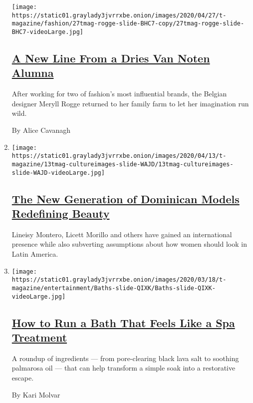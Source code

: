 \begin{enumerate}
  \texttt{[image: https://static01.graylady3jvrrxbe.onion/images/2020/04/27/t-magazine/fashion/27tmag-rogge-slide-BHC7-copy/27tmag-rogge-slide-BHC7-videoLarge.jpg]}

  \hypertarget{a-new-line-from-a-dries-van-noten-alumna}{%
  \subsection{\texorpdfstring{\href{/2020/05/04/t-magazine/meryll-rogge.html}{A
  New Line From a Dries Van Noten
  Alumna}}{A New Line From a Dries Van Noten Alumna}}\label{a-new-line-from-a-dries-van-noten-alumna}}

  After working for two of fashion's most influential brands, the
  Belgian designer Meryll Rogge returned to her family farm to let her
  imagination run wild.

  By Alice Cavanagh
\item
  \texttt{[image: https://static01.graylady3jvrrxbe.onion/images/2020/04/13/t-magazine/13tmag-cultureimages-slide-WAJD/13tmag-cultureimages-slide-WAJD-videoLarge.jpg]}

  \hypertarget{the-new-generation-of-dominican-models-redefining-beauty}{%
  \subsection{\texorpdfstring{\href{/interactive/2020/04/13/t-magazine/dominican-republic-models.html}{The
  New Generation of Dominican Models Redefining
  Beauty}}{The New Generation of Dominican Models Redefining Beauty}}\label{the-new-generation-of-dominican-models-redefining-beauty}}

  Lineisy Montero, Licett Morillo and others have gained an
  international presence while also subverting assumptions about how
  women should look in Latin America.
\item
  \texttt{[image: https://static01.graylady3jvrrxbe.onion/images/2020/03/18/t-magazine/entertainment/Baths-slide-QIXK/Baths-slide-QIXK-videoLarge.jpg]}

  \hypertarget{how-to-run-a-bath-that-feels-like-a-spa-treatment}{%
  \subsection{\texorpdfstring{\href{/2020/03/20/t-magazine/best-bath-products.html}{How
  to Run a Bath That Feels Like a Spa
  Treatment}}{How to Run a Bath That Feels Like a Spa Treatment}}\label{how-to-run-a-bath-that-feels-like-a-spa-treatment}}

  A roundup of ingredients --- from pore-clearing black lava salt to
  soothing palmarosa oil --- that can help transform a simple soak into
  a restorative escape.

  By Kari Molvar
\end{enumerate}

